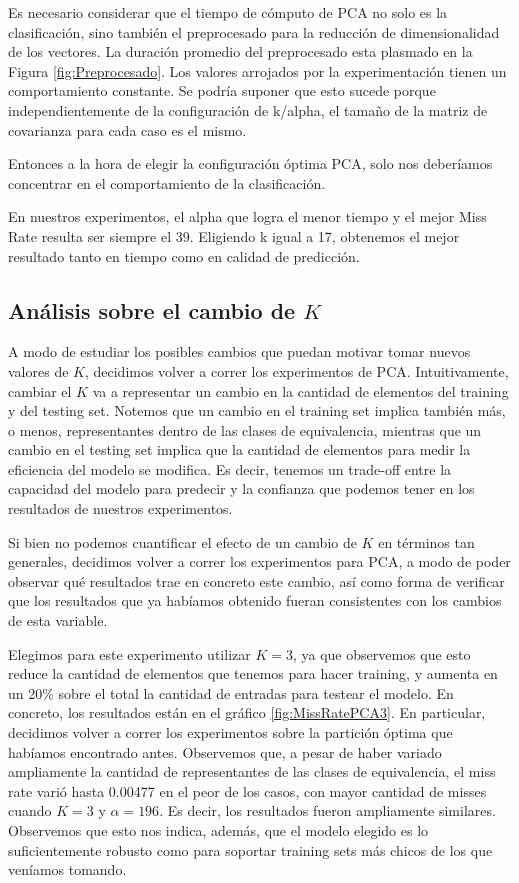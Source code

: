 \documentclass{article}
\begin{document}
Es necesario considerar que el tiempo de cómputo de PCA no solo es la clasificación, sino también el preprocesado para la reducción de dimensionalidad de los vectores. La duración promedio del preprocesado esta plasmado en la Figura  \ref{fig:Preprocesado}. Los valores arrojados por la experimentación tienen un comportamiento constante. Se podría suponer que esto sucede porque independientemente de la configuración de k/alpha, el tamaño de la matriz de covarianza para cada caso es el mismo.

Entonces a la hora de elegir la configuración óptima PCA, solo nos deberíamos concentrar en el comportamiento de la clasificación.

En nuestros experimentos, el alpha que logra el menor tiempo y el mejor Miss Rate resulta ser siempre el 39. Eligiendo k igual a 17, obtenemos el mejor resultado tanto en tiempo como en calidad de predicción.

 
\subsection*{Análisis sobre el cambio de $K$}

A modo de estudiar los posibles cambios que puedan motivar tomar nuevos valores de $K$, decidimos volver a correr los experimentos de PCA. Intuitivamente, cambiar el $K$ va a representar un cambio en la cantidad de elementos del training y del testing set. Notemos que un cambio en el training set implica también más, o menos, representantes dentro de las clases de equivalencia, mientras que un cambio en el testing set implica que la cantidad de elementos para medir la eficiencia del modelo se modifica. Es decir, tenemos un trade-off entre la capacidad del modelo para predecir y la confianza que podemos tener en los resultados de nuestros experimentos.

Si bien no podemos cuantificar el efecto de un cambio de $K$ en términos tan generales, decidimos volver a correr los experimentos para PCA, a modo de poder observar qué resultados trae en concreto este cambio, así como forma de verificar que los resultados que ya habíamos obtenido fueran consistentes con los cambios de esta variable.

Elegimos para este experimento utilizar $K = 3$, ya que observemos que esto reduce la cantidad de elementos que tenemos para hacer training, y aumenta en un 20\% sobre el total la cantidad de entradas para testear el modelo. En concreto, los resultados están en el gráfico \ref{fig:MissRatePCA3}. En particular, decidimos volver a correr los experimentos sobre la partición óptima que habíamos encontrado antes. Observemos que, a pesar de haber variado ampliamente la cantidad de representantes de las clases de equivalencia, el miss rate varió hasta 0.00477 en el peor de los casos, con mayor cantidad de misses cuando $K=3$ y $\alpha = 196$. Es decir, los resultados fueron ampliamente similares. Observemos que esto nos indica, además, que el modelo elegido es lo suficientemente robusto como para soportar training sets más chicos de los que veníamos tomando.
\end{document}
